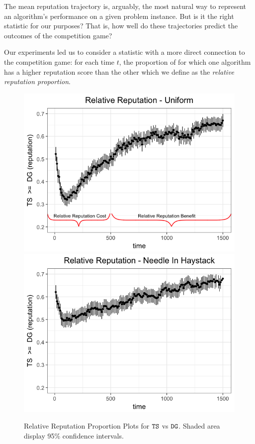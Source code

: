 \documentclass[../competing_bandits.tex]{subfiles}
\begin{document}
The mean reputation trajectory is, arguably, the most natural way to represent an algorithm's performance on a given problem instance. But is it the right statistic for our purposes? That is, how well do these trajectories predict the outcomes of the competition game?

Our experiments led us to consider a statistic with a more direct connection to the competition game: for each time $t$, the proportion of \MRVs for which one algorithm has a higher reputation score than the other which we define as the \textit{relative reputation proportion}.



\begin{figure}[ht]
\caption{Relative Reputation Proportion Plots for $\mathtt{TS}$ vs $\mathtt{DG}$. Shaded area display 95\% confidence intervals.}
\includegraphics[scale=0.35]{figures/relative_uniform_annotated_plot}
\includegraphics[scale=0.35]{figures/relative_nih_ts_dg.png}
\label{relative_rep_plots}

\end{figure}
\end{document}
